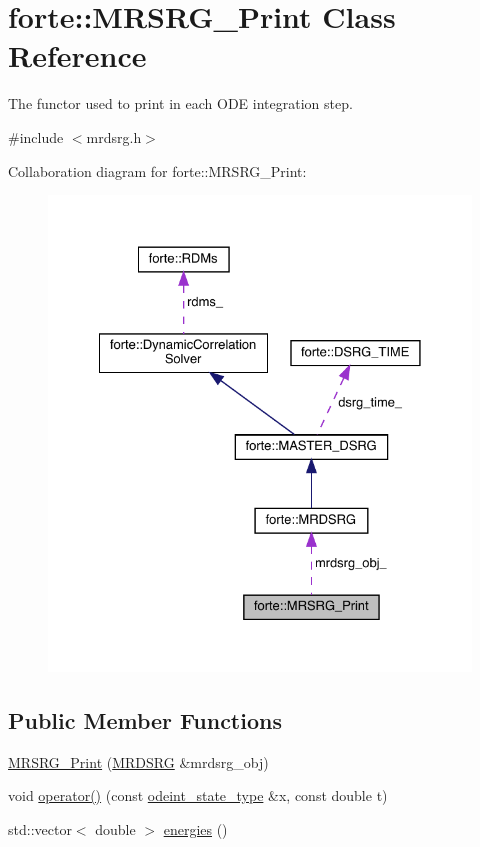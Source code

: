 \hypertarget{classforte_1_1_m_r_s_r_g___print}{}\section{forte\+:\+:M\+R\+S\+R\+G\+\_\+\+Print Class Reference}
\label{classforte_1_1_m_r_s_r_g___print}


The functor used to print in each O\+DE integration step.  




{\ttfamily \#include $<$mrdsrg.\+h$>$}



Collaboration diagram for forte\+:\+:M\+R\+S\+R\+G\+\_\+\+Print\+:
\nopagebreak
\begin{figure}[H]
\begin{center}
\leavevmode
\includegraphics[width=328pt]{classforte_1_1_m_r_s_r_g___print__coll__graph}
\end{center}
\end{figure}
\subsection*{Public Member Functions}
\begin{DoxyCompactItemize}
\item 
\mbox{\hyperlink{classforte_1_1_m_r_s_r_g___print_a56e027b3196873204b921aeb12c8b4cd}{M\+R\+S\+R\+G\+\_\+\+Print}} (\mbox{\hyperlink{classforte_1_1_m_r_d_s_r_g}{M\+R\+D\+S\+RG}} \&mrdsrg\+\_\+obj)
\item 
void \mbox{\hyperlink{classforte_1_1_m_r_s_r_g___print_a6f6d0a47245b1c9adf4be7e4590a9ff0}{operator()}} (const \mbox{\hyperlink{namespaceforte_ad8fa2d4b40cee55f959c09c9be68a63e}{odeint\+\_\+state\+\_\+type}} \&x, const double t)
\item 
std\+::vector$<$ double $>$ \mbox{\hyperlink{classforte_1_1_m_r_s_r_g___print_a8d5ab384ba3bc2c1a4e07ed2862a94bb}{energies}} ()
\end{DoxyCompactItemize}
